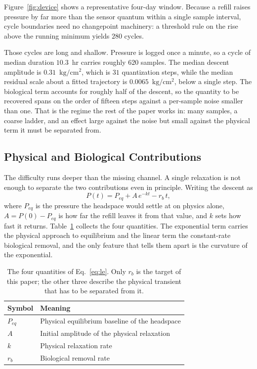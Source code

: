 \documentclass[runningheads]{llncs}
\newcommand{\pu}{\ensuremath{\mathrm{kg/cm^{2}}}}
\newcommand{\rb}{\ensuremath{r_{b}}}
\begin{document}
Figure~\ref{fig:device} shows a representative four-day window. Because a refill raises
pressure by far more than the sensor quantum within a single sample
interval, cycle boundaries need no changepoint machinery: a threshold
rule on the rise above the running minimum yields $280$ cycles.

Those cycles are long and shallow. Pressure is logged once a minute, so
a cycle of median duration $10.3$~hr carries roughly $620$ samples. The
median descent amplitude is $0.31$~\pu{}, which is $31$ quantization
steps, while the median residual scale about a fitted trajectory is
$0.0065$~\pu{}, below a single step. The biological term accounts for
roughly half of the descent, so the quantity to be recovered spans on
the order of fifteen steps against a per-sample noise smaller than one.
That is the regime the rest of the paper works in: many samples, a
coarse ladder, and an effect large against the noise but small against
the physical term it must be separated from.

\subsection{Physical and Biological Contributions}

The difficulty runs deeper than the missing channel. A single
relaxation is not enough to separate the two contributions even in
principle. Writing the descent as
\begin{equation}
P(t)=P_{eq}+A\,e^{-kt}-\rb\,t ,
\label{eq:le}
\end{equation}
where $P_{eq}$ is the pressure the headspace would settle at on physics
alone, $A=P(0)-P_{eq}$ is how far the refill leaves it from that value,
and $k$ sets how fast it returns. Table~\ref{tab:params} collects the
four quantities. The exponential term carries the physical approach to
equilibrium and the linear term the constant-rate biological removal,
and the only feature that tells them apart is the curvature of the
exponential.

\begin{table}[t]
\caption{The four quantities of Eq.~\eqref{eq:le}. Only \rb{} is the
target of this paper; the other three describe the physical transient
that has to be separated from it.}
\label{tab:params}
\centering
\begin{tabular}{ll}
\toprule
Symbol & Meaning \\
\midrule
$P_{eq}$ & Physical equilibrium baseline of the headspace \\
$A$      & Initial amplitude of the physical relaxation \\
$k$      & Physical relaxation rate \\
\rb{}    & Biological removal rate \\
\bottomrule
\end{tabular}
\end{table}
\end{document}
